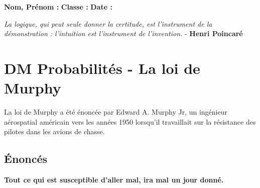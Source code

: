 



\textbf{Nom, Prénom :} \hspace{8cm} \textbf{Classe :} \hspace{3cm} \textbf{Date :}\\

\vspace{-0.8cm}

\begin{center}
  \textit{La logique, qui peut seule donner la certitude, est l’instrument de la démonstration : l’intuition est l’instrument de l’invention.}  - \textbf{Henri Poincaré }
\end{center}

\vspace{-0.8cm}
\section*{DM Probabilités - La loi de Murphy}

La loi de Murphy a été énoncée par Edward A. Murphy Jr, un ingénieur aérospatial américain vers les années 1950 lorsqu'il travaillait sur la résistance des pilotes dans les avions de chasse.

\subsection*{Énoncés}

\begin{center}
    \textbf{\og Tout ce qui est susceptible d'aller mal, ira mal un jour donné.\fg}
\end{center}

